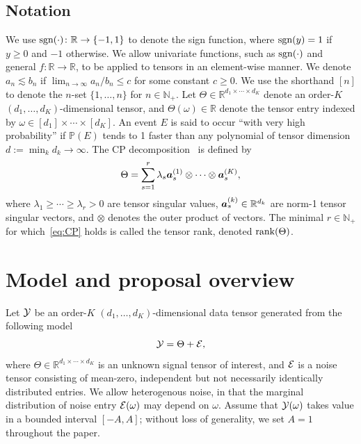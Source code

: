 \documentclass[11pt]{article}
\theoremstyle{plain}
\theoremstyle{definition}
\def\sign{\textup{sgn}}
\def\rank{\textup{rank}}
\begin{document}
\subsection{Notation}
We use $\sign(\cdot)\colon \mathbb{R}\to\{-1,1\}$ to denote the sign function, where $\sign(y)=1$ if $y\geq 0$ and $-1$ otherwise. We allow univariate functions, such as $\sign(\cdot)$ and general $f\colon \mathbb{R}\to\mathbb{R}$, to be applied to tensors in an element-wise manner. 
We denote $a_n\lesssim b_n$ if $\lim_{n\to \infty} a_n/b_n\leq c$ for some constant $c\geq0$.  We use the shorthand $[n]$ to denote the $n$-set $\{1,\ldots,n\}$ for $n\in\mathbb{N}_{+}$. Let $\Theta\in\mathbb{R}^{d_1\times \cdots \times d_K}$ denote an order-$K$ $(d_1,\ldots,d_K)$-dimensional tensor, and $\Theta(\omega)\in\mathbb{R}$ denote the tensor entry indexed by $\omega \in[d_1]\times \cdots \times [d_K]$. An event $E$ is said to occur ``with very high probability'' if $\mathbb{P}(E)$ tends to 1 faster than any polynomial of tensor dimension $d:=\min_k d_k \to\infty$. The CP decomposition~\citep{hitchcock1927expression} is defined by
\begin{equation}\label{eq:CP}
\Theta=\sum_{s=1}^r\lambda_s \bm{a}^{(1)}_s\otimes\cdots\otimes \bm{a}^{(K)}_s,
\end{equation}
where $\lambda_1\geq \cdots \geq \lambda_r>0$ are tensor singular values, $\bm{a}^{(k)}_s\in\mathbb{R}^{d_k}$ are norm-1 tensor singular vectors, and $\otimes$ denotes the outer product of vectors. The minimal $r\in\mathbb{N}_{+}$ for which~\eqref{eq:CP} holds is called the tensor rank, denoted $\rank(\Theta)$.  


\section{Model and proposal overview}\label{sec:overview}
Let $\mathcal{Y}$ be an order-$K$ $(d_1,\ldots,d_K)$-dimensional data tensor generated from the following model
\begin{equation}\label{eq:model}
\mathcal{Y}=\Theta+\mathcal{E},
\end{equation}
where $\Theta\in\mathbb{R}^{d_1\times \cdots \times d_K}$ is an unknown signal tensor of interest, and $\mathcal{E}$ is a noise tensor consisting of mean-zero, independent but not necessarily identically distributed entries. We allow heterogenous noise, in that the marginal distribution of noise entry $\mathcal{E}(\omega)$ may depend on $\omega$. Assume that $\mathcal{Y}(\omega)$ takes value in a bounded interval $[-A, A]$; without loss of generality, we set $A=1$ throughout the paper.  
\end{document}
